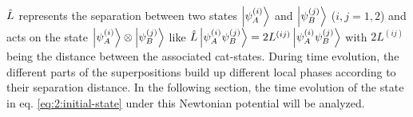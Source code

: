 $\hat{L}$ represents the separation between two states $\ket{\psi^{(i)}_A}$ and $\ket{\psi^{(j)}_B}$ ($i,j=1,2$) and acts on the state $\ket{\psi^{(i)}_A} \otimes \ket{\psi^{(j)}_B}$ like $\hat{L} \ket{\psi^{(i)}_A \psi^{(j)}_B} = 2L^{(ij)}\ket{\psi^{(i)}_A \psi^{(j)}_B}$ with $2L^{(ij)}$ being the distance between the associated cat-states.
During time evolution, the different parts of the superpositions build up different local phases according to their separation distance.  In the following section, the time evolution of the state in eq. \eqref{eq:2:initial-state} under this Newtonian potential will be analyzed.







